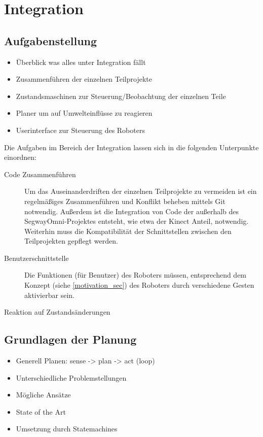 
\chapter{Integration}
\label{integration_cha}
\authorsection{\editorjulian}

\section{Aufgabenstellung}
\label{aufgabenstellung_integration_sec}

\begin{itemize}
	\item Überblick was alles unter Integration fällt
	\item Zusammenführen der einzelnen Teilprojekte
	\item Zustandsmaschinen zur Steuerung/Beobachtung der einzelnen Teile
	\item Planer um auf Umwelteinflüsse zu reagieren
	\item Userinterface zur Steuerung des Roboters
\end{itemize}

Die Aufgaben im Bereich der Integration lassen sich in die folgenden Unterpunkte einordnen:
\begin{description}
	\item[Code Zusammenführen]
	Um das Auseinanderdriften der einzelnen Teilprojekte zu vermeiden ist ein regelmäßiges Zusammenführen und Konflikt beheben mittels Git notwendig. Außerdem ist die Integration von Code der außerhalb des SegwayOmni-Projektes entsteht, wie etwa der Kinect Anteil, notwendig. Weiterhin muss die Kompatibilität der Schnittstellen zwischen den Teilprojekten gepflegt werden.
	\item[Benutzerschnittstelle]
	Die Funktionen (für Benutzer) des Roboters müssen, entsprechend dem Konzept (siehe \ref{motivation_sec}) des Roboters durch verschiedene Gesten aktivierbar sein.
	
	\item[Reaktion auf Zustandsänderungen]

\end{description}


\section{Grundlagen der Planung}
\label{grundlagen_integration_sec}

\begin{itemize}
	\item Generell Planen: sense -> plan -> act (loop)
	\item Unterschiedliche Problemstellungen
	\item Mögliche Ansätze
	\item State of the Art
	\item Umsetzung durch Statemachines
\end{itemize}


